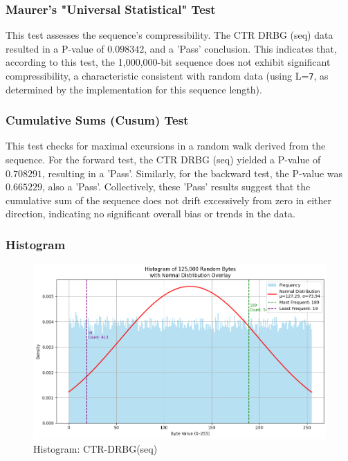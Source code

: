 \subsubsection{\textbf{Maurer's "Universal Statistical" Test}}
This test assesses the sequence's compressibility. The CTR DRBG (seq) data resulted in a P-value of $0.098342$, and a 'Pass' conclusion. This indicates that, according to this test, the 1,000,000-bit sequence does not exhibit significant compressibility, a characteristic consistent with random data (using L=\texttt{7}, as determined by the implementation for this sequence length).

\subsubsection{\textbf{Cumulative Sums (Cusum) Test}}
This test checks for maximal excursions in a random walk derived from the sequence. For the forward test, the CTR DRBG (seq) yielded a P-value of $0.708291$, resulting in a 'Pass'. Similarly, for the backward test, the P-value was $0.665229$, also a 'Pass'. Collectively, these 'Pass' results suggest that the cumulative sum of the sequence does not drift excessively from zero in either direction, indicating no significant overall bias or trends in the data.

\subsubsection{\textbf{Histogram}}


\begin{figure}[htbp] 
    \centering 
    \includegraphics[width=0.9\columnwidth]{images/Hist_seq.png} 
    \caption{Histogram: CTR-DRBG(seq)}
    \label{fig:H:CTR(seq)}
\end{figure}

